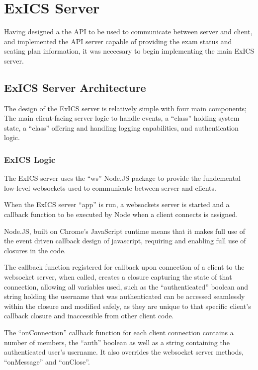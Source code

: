 \chapter{ExICS Server}

\label{ch:exicsserver}

Having designed a the API to be used to communicate between server and client, and implemented the API server capable of providing the exam status and seating plan information, it was neccesary to begin implementing the main ExICS server.

\section{ExICS Server Architecture}

The design of the ExICS server is relatively simple with four main components; The main client-facing server logic to handle events, a ``class'' holding system state, a ``class'' offering and handling logging capabilities, and authentication logic.

\subsection{ExICS Logic}

The ExICS server uses the ``ws'' Node.JS package\cite{einarosWS} to provide the fundemental low-level websockets used to communicate between server and clients.

When the ExICS server ``app'' is run, a websockets server is started and a callback function to be executed by Node when a client connects is assigned.

Node.JS, built on Chrome's JavaScript runtime means that it makes full use of the event driven callback design of javascript, requiring and enabling full use of closures in the code.

The callback function registered for callback upon connection of a client to the websocket server, when called, creates a closure capturing the state of that connection, allowing all variables used, such as the ``authenticated'' boolean and string holding the username that was authenticated can be accessed seamlessly within the closure and modified safely, as they are unique to that specific client's callback closure and inaccessible from other client code.

The ``onConnection'' callback function for each client connection contains a number of members, the ``auth'' boolean as well as a string containing the authenticated user's username.  It also overrides the websocket server methods, ``onMessage'' and ``onClose''.

